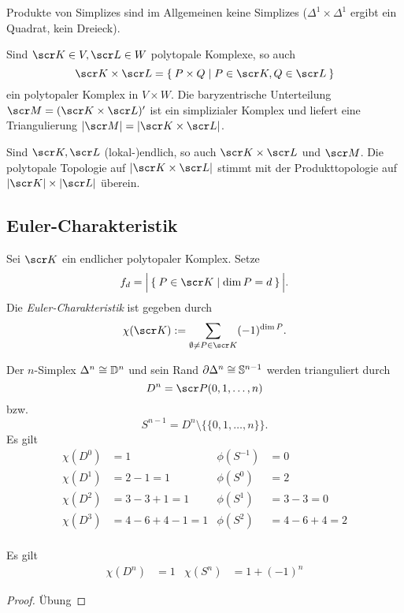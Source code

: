 Produkte von Simplizes sind im Allgemeinen keine Simplizes ($\Delta^1 \times \Delta^1$ ergibt ein Quadrat, kein Dreieck).

\begin{st}
	Sind $\scr K \in V, \scr L \in W$ polytopale Komplexe, so auch
	\[
		\scr K \times \scr L = \Set{ P \times Q | P \in \scr K, Q \in \scr L }
	\]
	ein polytopaler Komplex in $V \times W$.
	Die baryzentrische Unterteilung $\scr M = (\scr K \times \scr L)'$ ist ein simplizialer Komplex und liefert eine Triangulierung $| \scr M| = | \scr K \times \scr L|$.

	Sind $\scr K, \scr L$ (lokal-)endlich, so auch $\scr K \times \scr L$ und $\scr M$.
	Die polytopale Topologie auf $|\scr K \times \scr L|$ stimmt mit der Produkttopologie auf $|\scr K| \times |\scr L|$ überein.
\end{st}

\subsection{Euler-Charakteristik}

\begin{df}
	Sei $\scr K$ ein endlicher polytopaler Komplex.
	Setze
	\[
		f_d = \Big| \Set{ P \in \scr K | \dim P = d } \Big|.
	\]
	Die \emph{Euler-Charakteristik} ist gegeben durch
	\[
		\chi(\scr K)
		:= \sum_{\emptyset \neq P \in \scr K}
		(-1)^{\dim P}.
	\]
\end{df}

\begin{ex}
	Der $n$-Simplex $\Delta^n \cong \mathbb{D}^n$ und sein Rand $\partial \Delta^n \cong \mathbb{S}^{n-1}$ werden trianguliert durch
	\[
		D^n
		= \scr P({0,1, \dotsc, n})
	\]
	bzw.
	\[
		S^{n-1}
		= D^n \setminus \{ \{0,1,\dotsc,n\} \}.
	\]
	Es gilt
	\begin{align*}
		\chi(D^0) &= 1 &
		\phi(S^{-1}) &= 0 \\
		\chi(D^1) &= 2-1 = 1 &
		\phi(S^{0}) &= 2 \\
		\chi(D^2) &= 3 - 3 + 1 = 1 &
		\phi(S^{1}) &= 3 - 3 = 0 \\
		\chi(D^3) &= 4 - 6 + 4 - 1 = 1 &
		\phi(S^{2}) &= 4 - 6 + 4 = 2 \\
	\end{align*}
\end{ex}

\begin{prop}
	Es gilt
	\begin{align*}
		\chi(D^n) &= 1 &
		\chi(S^n) &= 1 + (-1)^n
	\end{align*}
	\begin{proof}
		Übung
	\end{proof}
\end{prop}

